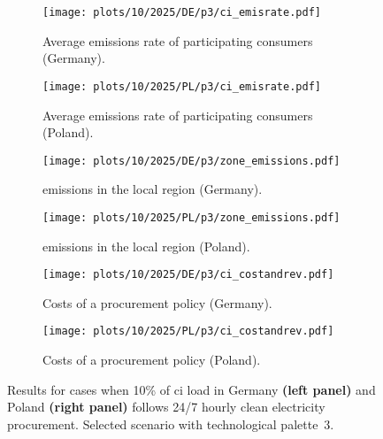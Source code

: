 \begin{figure*}
    \centering
    \begin{subfigure}{0.5\textwidth}
        \centering
        \caption{Average emissions rate of participating consumers (Germany).}
        \texttt{[image: plots/10/2025/DE/p3/ci\_emisrate.pdf]}
        \label{fig:10-2025-DE-p3-ci_emisrate}
    \end{subfigure}%
    \begin{subfigure}{0.5\textwidth}
        \centering
        \caption{Average emissions rate of participating consumers (Poland).}
        \texttt{[image: plots/10/2025/PL/p3/ci\_emisrate.pdf]}
        \label{fig:10-2025-PL-p3-ci_emisrate}
    \end{subfigure}

    \begin{subfigure}{0.5\textwidth}
        \centering
        \caption{\co emissions in the local region (Germany).}
        \texttt{[image: plots/10/2025/DE/p3/zone\_emissions.pdf]}
        \label{fig:10-2025-DE-p3-zone_emissions}
    \end{subfigure}%
    \begin{subfigure}{0.5\textwidth}
        \centering
        \caption{\co emissions in the local region (Poland).}
        \texttt{[image: plots/10/2025/PL/p3/zone\_emissions.pdf]}
        \label{fig:10-2025-PL-p3-zone_emissions}
    \end{subfigure}%

    \begin{subfigure}{0.5\textwidth}
        \centering
        \caption{Costs of a procurement policy (Germany).}
        \texttt{[image: plots/10/2025/DE/p3/ci\_costandrev.pdf]}
        \label{fig:10-2025-DE-p3-ci_costandrev}
    \end{subfigure}%
    \begin{subfigure}{0.5\textwidth}
        \centering
        \caption{Costs of a procurement policy (Poland).}
        \texttt{[image: plots/10/2025/PL/p3/ci\_costandrev.pdf]}
        \label{fig:10-2025-PL-p3-ci_costandrev}
    \end{subfigure}

    \caption{Results for cases when 10\% of \gls{ci} load in Germany \textbf{(left panel)} and Poland \textbf{(right panel)} follows 24/7 hourly clean electricity procurement. Selected scenario with technological palette~3.}
    \label{fig:10-2025-DEPL-p3-4plots}
\end{figure*}


